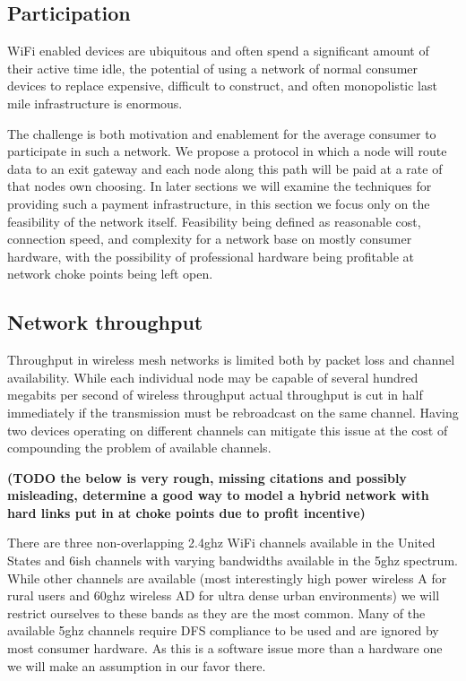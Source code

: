 \documentclass[11pt]{article}
\begin{document}
    \subsection{Participation}

    WiFi enabled devices are ubiquitous and often spend a significant amount of their active time idle, the potential of using a network of normal consumer devices to replace expensive, difficult to construct, and often monopolistic last mile infrastructure is enormous. 

    The challenge is both motivation and enablement for the average consumer to participate in such a network. We propose a protocol in which a node will route data to an exit gateway and each node along this path will be paid at a rate of that nodes own choosing. In later sections we will examine the techniques for providing such a payment infrastructure, in this section we focus only on the feasibility of the network itself. Feasibility being defined as reasonable cost, connection speed, and complexity for a network base on mostly consumer hardware, with the possibility of professional hardware being profitable at network choke points being left open. 

    \subsection{Network throughput}
    
    Throughput in wireless mesh networks is limited both by packet loss and channel availability. While each individual node may be capable of several hundred megabits per second of wireless throughput actual throughput is cut in half immediately if the transmission must be rebroadcast on the same channel. Having two devices operating on different channels can mitigate this issue at the cost of compounding the problem of available channels. 
    
    \textbf{(TODO the below is very rough, missing citations and possibly misleading, determine a good way to model a hybrid network with hard links put in at choke points due to profit incentive)}
    
    There are three non-overlapping 2.4ghz WiFi channels available in the United States and 6ish channels with varying bandwidths available in the 5ghz spectrum. While other channels are available (most interestingly high power wireless A for rural users and 60ghz wireless AD for ultra dense urban environments) we will restrict ourselves to these bands as they are the most common. Many of the available 5ghz channels require DFS compliance to be used and are ignored by most consumer hardware. As this is a software issue more than a hardware one we will make an assumption in our favor there. 
    
\end{document}
